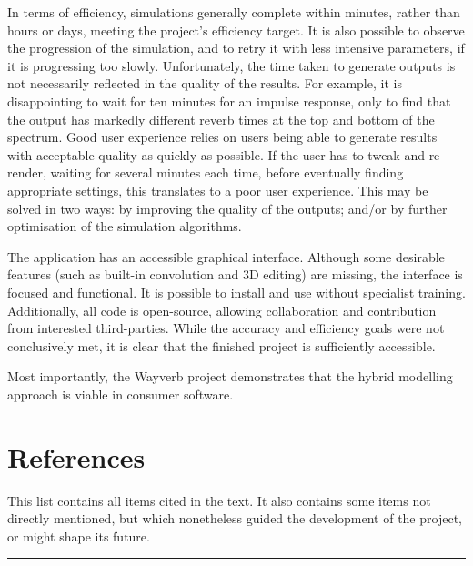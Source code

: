 \documentclass[]{scrreprt}
\begin{document}
In terms of efficiency, simulations generally complete within minutes,
rather than hours or days, meeting the project's efficiency target. It
is also possible to observe the progression of the simulation, and to
retry it with less intensive parameters, if it is progressing too
slowly. Unfortunately, the time taken to generate outputs is not
necessarily reflected in the quality of the results. For example, it is
disappointing to wait for ten minutes for an impulse response, only to
find that the output has markedly different reverb times at the top and
bottom of the spectrum. Good user experience relies on users being able
to generate results with acceptable quality as quickly as possible. If
the user has to tweak and re-render, waiting for several minutes each
time, before eventually finding appropriate settings, this translates to
a poor user experience. This may be solved in two ways: by improving the
quality of the outputs; and/or by further optimisation of the simulation
algorithms.

The application has an accessible graphical interface. Although some
desirable features (such as built-in convolution and 3D editing) are
missing, the interface is focused and functional. It is possible to
install and use without specialist training. Additionally, all code is
open-source, allowing collaboration and contribution from interested
third-parties. While the accuracy and efficiency goals were not
conclusively met, it is clear that the finished project is sufficiently
accessible.

Most importantly, the Wayverb project demonstrates that the hybrid
modelling approach is viable in consumer software.

\chapter*{References}\label{references}

This list contains all items cited in the text. It also contains some
items not directly mentioned, but which nonetheless guided the
development of the project, or might shape its future.

\begin{center}\rule{0.5\linewidth}{\linethickness}\end{center}

\noindent
\vspace{-2em} \setlength{\parindent}{-0.5in}
\setlength{\leftskip}{0.5in} \setlength{\parskip}{15pt}
\end{document}
